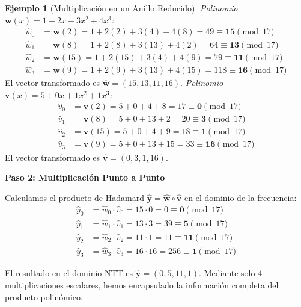 \documentclass[11pt, a4paper]{report}
\theoremstyle{definition}
\newtheorem{ejemplo}{Ejemplo}[chapter]
\begin{document}
\begin{ejemplo}[Multiplicación en un Anillo Reducido]
\vspace{0.3cm}


\textit{Polinomio $\mathbf{w}(x) = 1 + 2x + 3x^2 + 4x^3$:}
\begin{align*}
    \hat{w}_0 &= \mathbf{w}(2)  = 1 + 2(2) + 3(4) + 4(8)   = 49  \equiv \mathbf{15} \pmod{17} \\
    \hat{w}_1 &= \mathbf{w}(8)  = 1 + 2(8) + 3(13) + 4(2)  = 64  \equiv \mathbf{13} \pmod{17} \\
    \hat{w}_2 &= \mathbf{w}(15) = 1 + 2(15) + 3(4) + 4(9)  = 79  \equiv \mathbf{11} \pmod{17} \\
    \hat{w}_3 &= \mathbf{w}(9)  = 1 + 2(9) + 3(13) + 4(15) = 118 \equiv \mathbf{16} \pmod{17}
\end{align*}
El vector transformado es $\hat{\mathbf{w}} = (15, 13, 11, 16)$.
\vspace{0.3cm}
\textit{Polinomio $\mathbf{v}(x) = 5 + 0x + 1x^2 + 1x^3$:}
\begin{align*}
    \hat{v}_0 &= \mathbf{v}(2)  = 5 + 0 + 4 + 8    = 17 \equiv \mathbf{0} \pmod{17} \\
    \hat{v}_1 &= \mathbf{v}(8)  = 5 + 0 + 13 + 2   = 20 \equiv \mathbf{3} \pmod{17} \\
    \hat{v}_2 &= \mathbf{v}(15) = 5 + 0 + 4 + 9    = 18 \equiv \mathbf{1} \pmod{17} \\
    \hat{v}_3 &= \mathbf{v}(9)  = 5 + 0 + 13 + 15  = 33 \equiv \mathbf{16} \pmod{17}
\end{align*}
El vector transformado es $\hat{\mathbf{v}} = (0, 3, 1, 16)$.\vspace{0.3cm}

\textbf{Paso 2: Multiplicación Punto a Punto}

Calculamos el producto de Hadamard $\hat{\mathbf{y}} = \hat{\mathbf{w}} \circ \hat{\mathbf{v}}$ en el dominio de la frecuencia:
\begin{align*}
    \hat{y}_0 &= \hat{w}_0 \cdot \hat{v}_0 = 15 \cdot 0  = 0  \equiv \mathbf{0} \pmod{17} \\
    \hat{y}_1 &= \hat{w}_1 \cdot \hat{v}_1 = 13 \cdot 3  = 39 \equiv \mathbf{5} \pmod{17} \\
    \hat{y}_2 &= \hat{w}_2 \cdot \hat{v}_2 = 11 \cdot 1  = 11 \equiv \mathbf{11} \pmod{17} \\
    \hat{y}_3 &= \hat{w}_3 \cdot \hat{v}_3 = 16 \cdot 16 = 256 \equiv \mathbf{1} \pmod{17}
\end{align*}

El resultado en el dominio NTT es $\hat{\mathbf{y}} = (0, 5, 11, 1)$. Mediante solo 4 multiplicaciones escalares, hemos encapsulado la información completa del producto polinómico.
\end{ejemplo}
\end{document}
